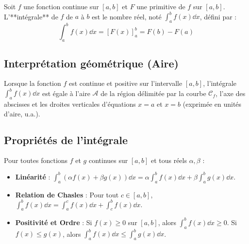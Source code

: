 \begin{definition}[Intégrale]
Soit $f$ une fonction continue sur $[a, b]$ et $F$ une primitive de $f$ sur $[a, b]$.
L'**intégrale** de $f$ de $a$ à $b$ est le nombre réel, noté $\int_a^b f(x) \dd x$, défini par :
\[
\int_a^b f(x) \dd x = [F(x)]_a^b = F(b) - F(a)
\]
\end{definition}

\subsection{Interprétation géométrique (Aire)}

Lorsque la fonction $f$ est continue et positive sur l'intervalle $[a, b]$, l'intégrale $\int_a^b f(x) \dd x$ est égale à l'aire $\mathcal{A}$ de la région délimitée par la courbe $\mathcal{C}_f$, l'axe des abscisses et les droites verticales d'équations $x=a$ et $x=b$ (exprimée en unités d'aire, u.a.).

\begin{center}
\end{center}

\subsection{Propriétés de l'intégrale}

Pour toutes fonctions $f$ et $g$ continues sur $[a, b]$ et tous réels $\alpha, \beta$ :
\begin{itemize}
    \item \textbf{Linéarité} : $\int_a^b (\alpha f(x) + \beta g(x)) \dd x = \alpha \int_a^b f(x) \dd x + \beta \int_a^b g(x) \dd x$.
    \item \textbf{Relation de Chasles} : Pour tout $c \in [a, b]$, $\int_a^b f(x) \dd x = \int_a^c f(x) \dd x + \int_c^b f(x) \dd x$.
    \item \textbf{Positivité et Ordre} : Si $f(x) \ge 0$ sur $[a,b]$, alors $\int_a^b f(x) \dd x \ge 0$. Si $f(x) \le g(x)$, alors $\int_a^b f(x) \dd x \le \int_a^b g(x) \dd x$.
\end{itemize}

